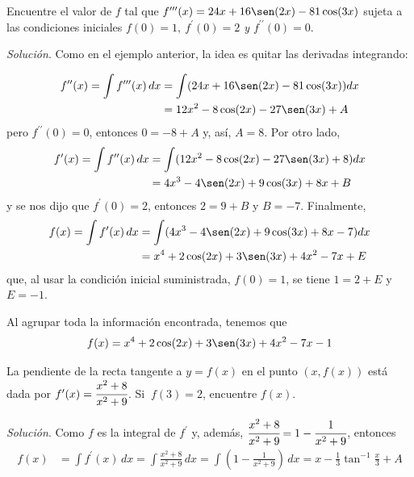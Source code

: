\begin{ejemplo}
\textnormal{Encuentre el valor de \textit{$f$} tal que \textit{$f^{\prime \prime \prime}(x)=24x+16\sen (2x)-81\cos (3x)$} sujeta a las condiciones iniciales \textit{$f(0)=1,\ f^{\prime}(0)=2$ y $f^{\prime\prime}(0)=0$}}.
\end{ejemplo}


\textit{Solución}. Como en el ejemplo anterior, la idea es quitar las derivadas integrando:

\begin{align*}
f^{\prime \prime }(x)=\int f^{\prime \prime\prime }(x)\, dx &=\int (24x+16\sen (2x)-81\cos (3x))dx\\
&=12x^{2}-8\cos (2x)-27\sen (3x)+A
\end{align*}
pero $f^{\prime \prime }(0)=0$, entonces $0=-8+A$ y, así, $A=8$. Por otro lado,
\begin{align*}
 f^{\prime }(x)=\int f^{\prime \prime }(x)\, dx &= \int (12x^{2}-8\cos (2x)-27\sen (3x)+8)dx \\
 &=4x^{3}-4\sen (2x)+9\cos (3x)+8x+B
\end{align*}
y se nos dijo que $f^\prime (0)=2$, entonces $2=9+B$ y $B=-7$. Finalmente,
\begin{align*}
f(x)=\int f^\prime(x) \, dx &=\int (4x^{3}-4\sen (2x)+9\cos (3x)+8x-7)dx \\
 &=x^{4}+2\cos (2x)+3\sen (3x)+4x^2-7x+E
\end{align*}
que, al usar la condición inicial suministrada, $f(0)=1$, se tiene $1=2+E$ y $E=-1$.

Al agrupar toda la información encontrada, tenemos que
\[
f(x)=x^{4}+2\cos (2x)+3\sen (3x)+4x^2-7x-1 
\]

\begin{ejemplo}
\textnormal{La pendiente de la recta tangente a {\small \textit{$y=f(x)$}} en el punto {\small \textit{$(x,f(x))$}} está dada por {\small \textit{$f^{\prime }(x)=\cfrac{x^{2}+8}{x^{2}+9}$}}. Si {\small \textit{$\ f(3)=2$}}, encuentre {\small \textit{$f(x).$}}}
\end{ejemplo}

\textit{Solución}. Como $f$ es la integral de $f^\prime$ y, además, $\cfrac{x^{2}+8}{x^{2}+9}=1-\cfrac{1}{x^{2}+9}$, entonces
{\footnotesize
\begin{align*}
 f(x)&=\int f^{\prime }(x)\,dx=\int \frac{x^{2}+8}{x^{2}+9}\, dx =\int \left( 1-\frac{1}{x^{2}+9}\right)\,dx =x-\frac{1}{3}%
\tan^{-1} \frac{x}{3}+A
\end{align*}
}


